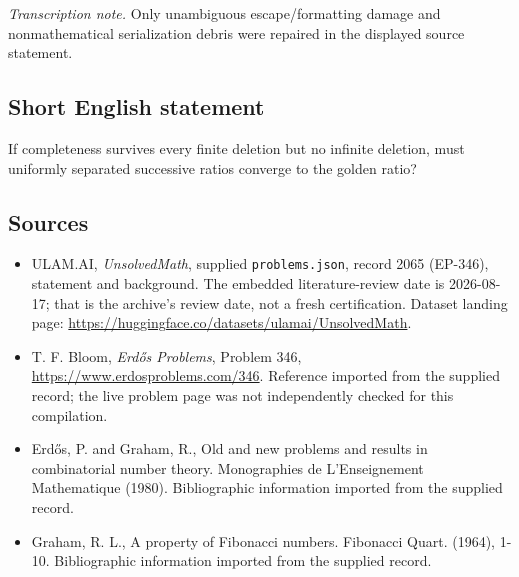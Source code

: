 \documentclass[11pt,a4paper]{article}
\begin{document}
{\small\emph{Transcription note.} Only unambiguous escape/formatting damage and nonmathematical serialization debris were repaired in the displayed source statement.}

\subsection{Short English statement}

If completeness survives every finite deletion but no infinite deletion, must uniformly separated successive ratios converge to the golden ratio?

\subsection{Sources}

{\small

\begin{itemize}

\item[\hypertarget{source:2065:1}{S1}] ULAM.AI, \emph{UnsolvedMath}, supplied \texttt{problems.json}, record 2065 (EP-346), statement and background. The embedded literature-review date is 2026-08-17; that is the archive’s review date, not a fresh certification. Dataset landing page: \url{https://huggingface.co/datasets/ulamai/UnsolvedMath}.

\item[\hypertarget{source:2065:2}{S2}] T. F. Bloom, \emph{Erdős Problems}, Problem 346, \url{https://www.erdosproblems.com/346}. Reference imported from the supplied record; the live problem page was not independently checked for this compilation.

\item[\hypertarget{source:2065:3}{S3}] Erd\H{o}s, P. and Graham, R., Old and new problems and results in combinatorial number theory. Monographies de L'Enseignement Mathematique (1980). Bibliographic information imported from the supplied record.

\item[\hypertarget{source:2065:4}{S4}] Graham, R. L., A property of Fibonacci numbers. Fibonacci Quart. (1964), 1-10. Bibliographic information imported from the supplied record.

\end{itemize}

}

\label{end:2065}
\end{document}
